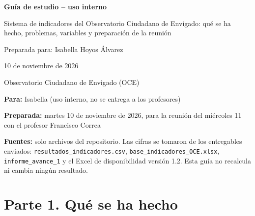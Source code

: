 \documentclass[11pt,letterpaper]{article}
\begin{document}
\hypersetup{pageanchor=false}
\begin{titlepage}
\centering
\vspace*{3.5cm}
{\LARGE\bfseries Guía de estudio -- uso interno\par}
\vspace{1.5cm}
{\large Sistema de indicadores del Observatorio Ciudadano de Envigado: qué se ha hecho, problemas, variables y preparación de la reunión\par}
\vspace{3cm}
{\large Preparada para: Isabella Hoyos Álvarez\par}
\vspace{0.5cm}
{\large 10 de noviembre de 2026\par}
\vfill
{\large Observatorio Ciudadano de Envigado (OCE)\par}
\end{titlepage}
\hypersetup{pageanchor=true}

\tableofcontents
\clearpage

\textbf{Para:} Isabella (uso interno, no se entrega a los profesores)

\textbf{Preparada:} martes 10 de noviembre de 2026, para la reunión del miércoles 11 con el profesor Francisco Correa

\textbf{Fuentes:} solo archivos del repositorio. Las cifras se tomaron de los entregables enviados: \texttt{\footnotesize resultados\_\allowbreak{}indicadores.\allowbreak{}csv}, \texttt{\footnotesize base\_\allowbreak{}indicadores\_\allowbreak{}OCE.\allowbreak{}xlsx}, \texttt{\footnotesize informe\_\allowbreak{}avance\_\allowbreak{}1} y el Excel de disponibilidad versión 1.2. Esta guía no recalcula ni cambia ningún resultado.

\begin{center}\end{center}

\clearpage

\section*{Parte 1. Qué se ha hecho}
\end{document}
